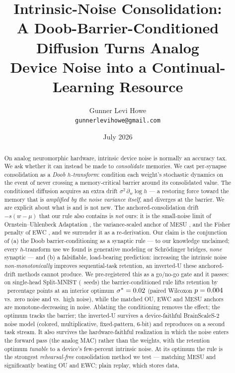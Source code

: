 \documentclass[11pt]{article}
\title{\vspace{-3em}Intrinsic-Noise Consolidation:\\
A Doob-Barrier-Conditioned Diffusion Turns Analog\\
Device Noise into a Continual-Learning Resource}
\author{Gunner Levi Howe\\ \small\texttt{gunnerlevihowe@gmail.com}}
\date{July 2026}
\newcommand{\wmu}{(w-\mu)}
\newcommand{\sigstar}{\sigma^{*}}
\begin{document}
\maketitle

\begin{abstract}
On analog neuromorphic hardware, intrinsic device noise is normally an accuracy
tax. We ask whether it can instead be made to \emph{consolidate} memories. We cast
per-synapse consolidation as a \emph{Doob $h$-transform}: condition each weight's
stochastic dynamics on the event of never crossing a memory-critical barrier
around its consolidated value. The conditioned diffusion acquires an extra drift
$\sigma^2\,\partial_w\log h$ --- a restoring force toward the memory that is
\emph{amplified by the noise variance itself}, and diverges at the barrier. We are
explicit about what is and is not new. The anchored-consolidation drift
$-s\wmu$ that our rule also contains is \emph{not} ours: it is the small-noise
limit of Ornstein--Uhlenbeck Adaptation \citep{oua2024}, the variance-scaled anchor
of MESU \citep{mesu2025}, and the Fisher penalty of EWC \citep{ewc2017}, and we
surrender it as a re-derivation. Our claim is the conjunction of (a) the Doob
barrier-conditioning as a synaptic rule --- to our knowledge unclaimed; every
$h$-transform use we found is generative modeling or Schr\"odinger bridges,
\emph{none} synaptic --- and (b) a falsifiable, load-bearing prediction: increasing
the intrinsic noise \emph{non-monotonically} improves sequential-task retention, an
inverted-U these anchored-drift methods cannot produce. We pre-registered this as a
go/no-go gate and it passes: on single-head Split-MNIST (\NumSeeds\ seeds) the
barrier-conditioned rule lifts retention by \GateFLiftPts\ percentage points at an
interior optimum $\sigstar=\GateFSigStar$ (paired Wilcoxon $p=0.004$ vs.\
zero noise and vs.\ high noise), while the matched OU, EWC and MESU anchors are
monotone-decreasing in noise. Ablating the conditioning removes the effect; the
optimum tracks the barrier; the inverted-U survives a device-faithful
BrainScaleS-2 noise model (colored, multiplicative, fixed-pattern, $6$-bit) and
reproduces on a second task stream. It also survives the hardware-faithful
realization in which the noise enters the forward pass (the analog MAC) rather than
the weights, with the retention optimum \emph{tunable} to a device's few-percent
intrinsic noise. At its optimum the rule is the strongest \emph{rehearsal-free}
consolidation method we test --- matching MESU and
significantly beating OU and EWC; plain replay, which stores data,

\end{abstract}
\end{document}

